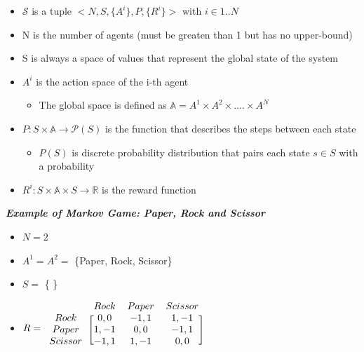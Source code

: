 \documentclass[12pt,a4paper,openright,twoside]{book}
\begin{document}
\begin{itemize}
  \item $\mathcal{S}$ is a tuple $<N, S, \{A^i\}, P,  \{R^i\}>$ with $i \in 1..N$
  \item N is the number of agents (must be greaten than 1 but has no upper-bound)
  \item S is always a space of values that represent the global state of the system
  \item $A^i$ is the action space of the i-th agent
  \begin{itemize}
       \item The global space is defined as $\mathbb{A} = A^1 \times A^2 \times .... \times A^N$
  \end{itemize}
  \item $P: S \times \mathbb{A} \rightarrow \mathcal{P}(S)$ is the function that describes the steps between each state
  \begin{itemize}
      \item $P(S)$ is discrete probability distribution that pairs each state $s \in S$ with a probability
  \end{itemize}
  \item $R^i: S \times \mathbb{A} \times S \rightarrow \mathbb{R}$ is the reward function
\end{itemize}

\begin{boxK}
\textbf{\textit{Example of Markov Game: Paper, Rock and Scissor}}

  \begin{itemize}
    \item $N = 2$
    \item $A^1 = A^2 = $ \{Paper, Rock, Scissor\}
    \item $S = $ \{ \}
    \item $R = \begin{blockarray}{cccc}
      & Rock & Paper & Scissor \\
    \begin{block}{c[ccc]}
      Rock    & 0, 0  & -1, 1 & 1, -1 \\
      Paper   & 1, -1 & 0, 0  & -1, 1 \\
      Scissor & -1, 1 & 1, -1 & 0, 0 \\
    \end{block}
  \end{blockarray}$
  \end{itemize}
\end{boxK}
\end{document}
